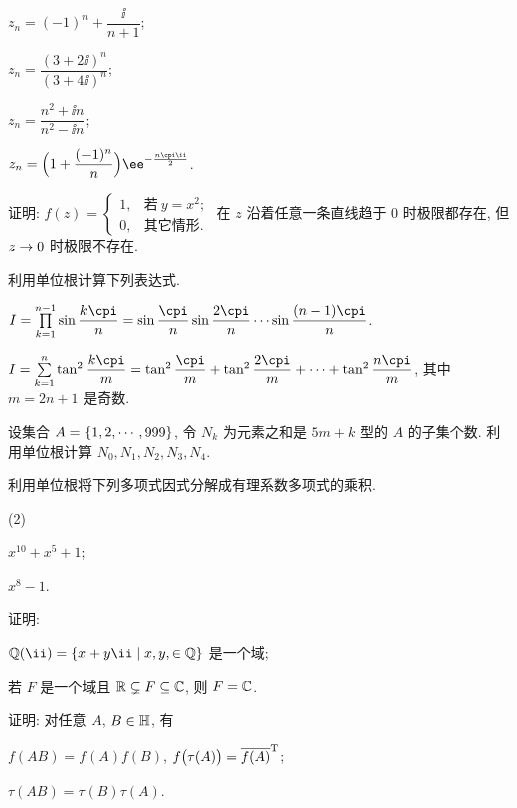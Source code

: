 \begin{homework}
\begin{homework}
\begin{subhomework}
      \item $z_n=(-1)^n+\dfrac{\ii}{n+1}$;
      \item $z_n=\dfrac{(3+2\ii)^n}{(3+4\ii)^n}$;
      \item $z_n=\dfrac{n^2+\ii n}{n^2-\ii n}$;
      \item $z_n=\Bigl(1+\dfrac{(-1)^n}n\Bigr)\ee^{-\frac{n\cpi \ii}2}$.
    \end{subhomework}
    \item 证明: $f(z)=\begin{cases}
      1,&\text{若}\ y=x^2;\\
      0,&\text{其它情形}.
    \end{cases}$ 在 $z$ 沿着任意一条直线趋于 $0$ 时极限都存在, 但 $z\rightarrow0$ 时极限不存在.
    \item \optionalex 利用单位根计算下列表达式.
      \begin{subhomework}
        \item $I=\prod\limits_{k=1}^{n-1}\sin\dfrac{k\cpi}n=\sin\dfrac{\cpi}n\sin\dfrac{2\cpi}n \cdots \sin\dfrac{(n-1)\cpi}n$.
        \item $I=\sum\limits_{k=1}^n\tan^2\dfrac{k\cpi}m=\tan^2\dfrac{\cpi}m+\tan^2\dfrac{2\cpi}m+\cdots+\tan^2\dfrac{n\cpi}m$, 其中 $m=2n+1$ 是奇数.
      \end{subhomework} 
    \item \optionalex 设集合 $A={\left\{1,2,\cdots,999\right\}}$, 令 $N_k$ 为元素之和是 $5m+k$ 型的 $A$ 的子集个数. 利用单位根计算 $N_0,N_1,N_2,N_3,N_4$.
    \item \optionalex 利用单位根将下列多项式因式分解成有理系数多项式的乘积.
      \begin{subhomework}(2)
        \item $x^{10}+x^5+1$;
        \item $x^8-1$.
      \end{subhomework}
    \item \optionalex 证明: 
      \begin{subhomework}
        \item $\BQ(\ii)=\{x+y\ii\mid x,y,\in\BQ\}$ 是一个域;
        \item 若 $F$ 是一个域且 ${\mathbb{R}}\subsetneq F\subseteq {\mathbb{C}}$, 则 $F={\mathbb{C}}$.
      \end{subhomework}
    \item \optionalex 证明: 对任意 $A$, $B\in{\mathbb{H}}$, 有
    \begin{subhomework}
      \item $f(AB)=f(A)f(B)$, $f\bigl(\tau(A)\bigr)=\overline{f(A)}^{{\mathrm{T}}}$;
      \item $\tau(AB)=\tau(B)\tau(A)$.
    \end{subhomework}
  \end{homework}
\end{homework}


